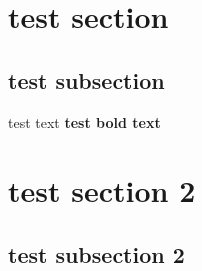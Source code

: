 \section{test section}
\subsection{test subsection}
test text
\textbf{test bold text}
\section{test section 2}
\subsection{test subsection 2}
